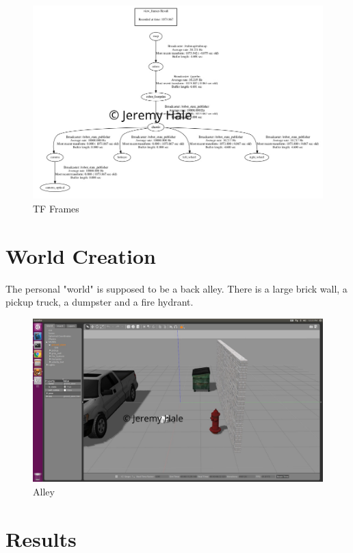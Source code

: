 \documentclass[10pt,journal,compsoc]{IEEEtran}
\begin{document}
\begin{figure}[thpb]
    \centering
    \includegraphics[width=\linewidth]{frames}
    \caption{TF Frames}
    \label{fig:frames}
\end{figure}

\section{World Creation}
The personal "world" is supposed to be a back alley. There is a large brick wall, a pickup truck, a dumpster and a fire hydrant.

\begin{figure}[thpb]
    \centering
    \includegraphics[width=\linewidth]{alley_no_cone}
    \caption{Alley}
    \label{fig:alley}
\end{figure}

\section{Results}
\end{document}

